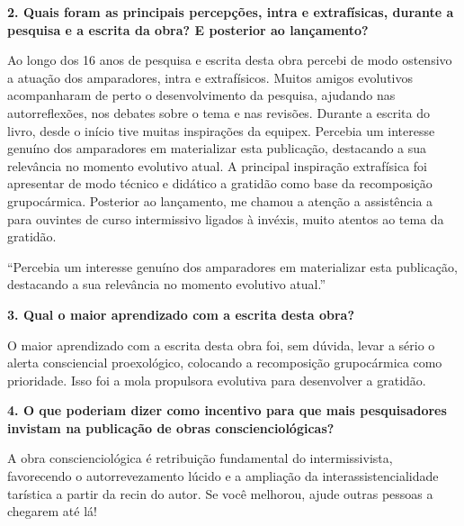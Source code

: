 \documentclass{gescons}
\begin{document}
\begin{multicols}{2}
\textbf{2. Quais foram as principais percepções, intra e extrafísicas, durante a pesquisa e a escrita da obra? E posterior ao lançamento?}

Ao longo dos 16 anos de pesquisa e escrita desta obra percebi de modo ostensivo a atuação dos amparadores, intra e extrafísicos. Muitos amigos evolutivos acompanharam de perto o desenvolvimento da pesquisa, ajudando nas autorreflexões, nos debates sobre o tema e nas revisões. Durante a escrita do livro, desde o início tive muitas inspirações da equipex. Percebia um interesse genuíno dos amparadores em materializar esta publicação, destacando a sua relevância no momento evolutivo atual. A principal inspiração extrafísica foi apresentar de modo técnico e didático a gratidão como base da recomposição grupocármica. Posterior ao lançamento, me chamou a atenção a assistência a para ouvintes de curso intermissivo ligados à invéxis, muito atentos ao tema da gratidão.

\begin{pullquote}
``Percebia um interesse genuíno dos amparadores em materializar esta publicação, destacando a sua relevância no momento evolutivo atual.''
\end{pullquote}

\textbf{3. Qual o maior aprendizado com a escrita desta obra?}

O maior aprendizado com a escrita desta obra foi, sem dúvida, levar a sério o alerta consciencial proexológico, colocando a recomposição grupocármica como prioridade. Isso foi a mola propulsora evolutiva para desenvolver a gratidão. 

\textbf{4. O que poderiam dizer como incentivo para que mais pesquisadores invistam na publicação de obras conscienciológicas?}

A obra conscienciológica é retribuição fundamental do intermissivista, favorecendo o autorrevezamento lúcido e a ampliação da interassistencialidade tarística a partir da recin do autor. Se você melhorou, ajude outras pessoas a chegarem até lá! 
    
    
    \end{multicols}
\end{document}
